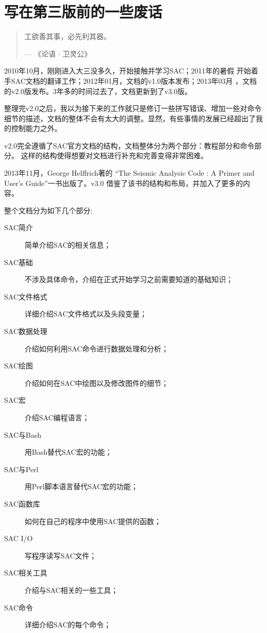 \section*{\centering 写在第三版前的一些废话}

\begin{quote}
工欲善其事，必先利其器。
\begin{flushright}
--- 《论语 $\cdot$ 卫灵公》
\end{flushright}
\end{quote}

2010年10月，刚刚进入大三没多久，开始接触并学习SAC；2011年的暑假
开始着手SAC文档的翻译工作；2012年01月，文档的v1.0版本发布；2013年03月
，文档的v2.0版发布。3年多的时间过去了，文档更新到了v3.0版。

整理完v2.0之后，我以为接下来的工作就只是修订一些拼写错误、增加一些对命令
细节的描述，文档的整体不会有太大的调整。显然，有些事情的发展已经超出了我
的控制能力之外。

v2.0完全遵循了SAC官方文档的结构，文档整体分为两个部分：教程部分和命令部分。
这样的结构使得想要对文档进行补充和完善变得非常困难。

2013年11月，George Helffrich著的
``The Seismic Analysic Code : A Primer and User's Guide''一书出版了。v3.0
借鉴了该书的结构和布局，并加入了更多的内容。

整个文档分为如下几个部分:
\begin{description}
\item[SAC简介] 简单介绍SAC的相关信息；
\item[SAC基础] 不涉及具体命令，介绍在正式开始学习之前需要知道的基础知识；
\item[SAC文件格式] 详细介绍SAC文件格式以及头段变量；
\item[SAC数据处理] 介绍如何利用SAC命令进行数据处理和分析；
\item[SAC绘图] 介绍如何在SAC中绘图以及修改图件的细节；
\item[SAC宏] 介绍SAC编程语言；
\item[SAC与Bash] 用Bash替代SAC宏的功能；
\item[SAC与Perl] 用Perl脚本语言替代SAC宏的功能；
\item[SAC函数库] 如何在自己的程序中使用SAC提供的函数；
\item[SAC I/O] 写程序读写SAC文件；
\item[SAC相关工具] 介绍与SAC相关的一些工具；
\item[SAC命令] 详细介绍SAC的每个命令；
\end{description}

